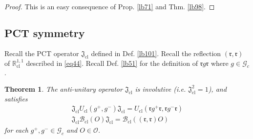 \documentclass[11pt,b5paper,notitlepage]{article}
\theoremstyle{definition}
\theoremstyle{plain}
\newtheorem{thm}[df]{Theorem}
\newcommand{\Gc}{\mathscr G_c}
\newcommand{\cl}{\mathrm{cl}}
\newcommand{\rk}{\mathfrak r}
\newcommand{\MO}{\mathcal O}
\newcommand{\Rcl}{\mathbb R^{1,1}_{\mathrm{cl}}}
\newcommand{\Bcl}{\mathcal B_{\mathrm{cl}}}
\newcommand{\Ucl}{U_{\mathrm{cl}}}
\newcommand{\Jcl}{\mathfrak J_{\mathrm{cl}}}
\numberwithin{equation}{section}
\begin{document}
\begin{proof}
This is an easy consequence of Prop. \ref{lb71} and Thm. \ref{lb98}.
\end{proof}






\subsection{PCT symmetry}\label{lb103}

Recall the PCT operator $\Jcl$ defined in Def. \ref{lb101}. Recall the reflection $(\rk,\rk)$ of $\Rcl$ described in \eqref{eq44}. Recall Def. \ref{lb51} for the definition of $\rk g\rk$ where $g\in\Gc$.

\begin{thm}\label{lb102}
The anti-unitary operator $\Jcl$ is involutive (i.e. $\Jcl^2=1$), and satisfies
\begin{subequations}\label{eq45}
\begin{gather}
\Jcl\Ucl(g^+,g^-)\Jcl=U_\cl(\rk g^+\rk,\rk g^-\rk)\label{eq45a}\\
\Jcl\Bcl(O)\Jcl=\Bcl((\rk,\rk)O)\label{eq45b}
\end{gather}
\end{subequations}
for each $g^+,g^-\in\Gc$ and $O\in\MO$.
\end{thm}
\end{document}
